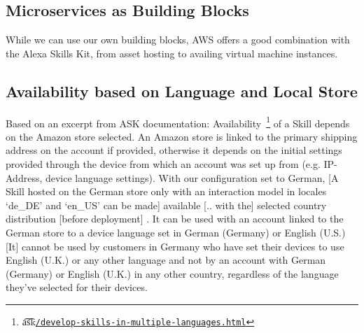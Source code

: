 	
	\subsection*{Microservices as Building Blocks} %
	While we can use our own building blocks, AWS offers a good combination with the Alexa Skills Kit, from asset hosting to availing virtual machine instances. 
	

	\subsection*{Availability based on Language and Local Store}
Based on an excerpt from ASK documentation: Availability~\footnote{\t{a\t{sk}}\href{https://developer.amazon.com/docs/custom-skills/develop-skills-in-multiple-languages.html}{\lstinline|/develop-skills-in-multiple-languages.html|}} of a Skill depends on the Amazon store selected. An Amazon store is linked to the primary shipping address on the account if provided, otherwise it depends on the initial settings provided through the device from which an account was set up from (e.g. IP-Address, device language settings). With our configuration set to German, 
%	
%		
[A Skill hosted on the German store only with an interaction model in locales `de\_DE' and `en\_US' can be made] \space available  [.. with the] selected country distribution [before deployment] \cite{alexaDesignGuide}.
It can be used with an account linked to the German store to a device language set in German (Germany) or English (U.S.) 
		[It] cannot be used by customers in Germany who have set their devices to use English (U.K.) or any other language
		and not by an account with German (Germany) or English (U.K.)
		in any other country, regardless of the language they've selected for their devices.
		
	
